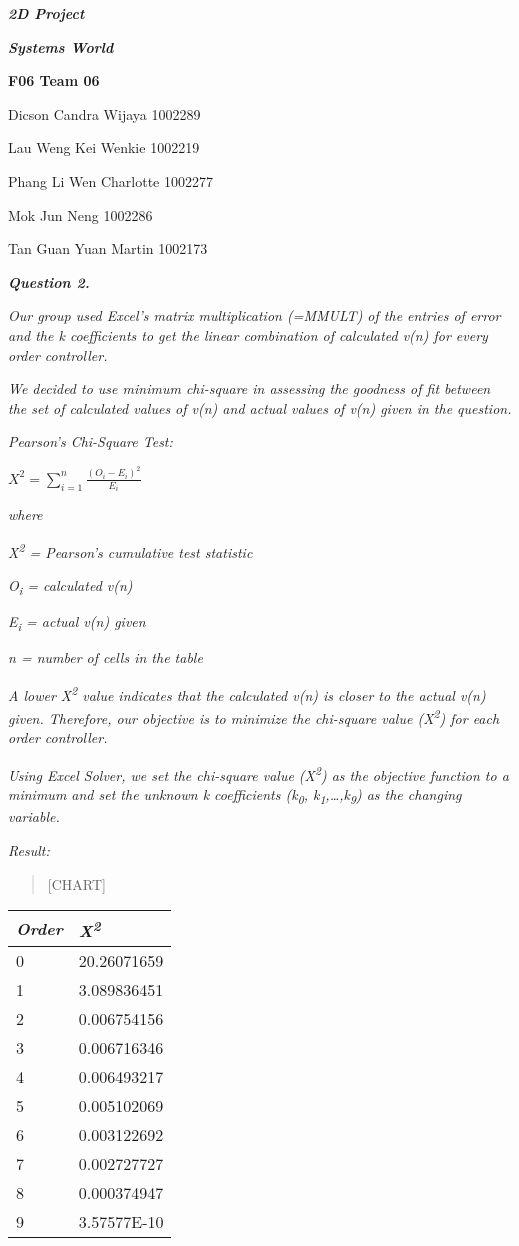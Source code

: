 \documentclass[]{article}
\date{}
\begin{document}
\emph{\textbf{2D Project}}

\emph{\textbf{Systems World}}

\textbf{F06 Team 06}

Dicson Candra Wijaya 1002289

Lau Weng Kei Wenkie 1002219

Phang Li Wen Charlotte 1002277

Mok Jun Neng 1002286

Tan Guan Yuan Martin 1002173

\emph{\textbf{Question 2.}}

\emph{Our group used Excel's matrix multiplication (=MMULT) of the
entries of error and the k coefficients to get the linear combination of
calculated v(n) for every order controller.}

\emph{We decided to use minimum chi-square in assessing the goodness of
fit between the set of calculated values of v(n) and actual values of
v(n) given in the question.}

\emph{Pearson's Chi-Square Test: }

\(X^{2} = \sum_{i = 1}^{n}\frac{\left( O_{i} - E_{i} \right)^{2}}{E_{i}}\)

\emph{where}

\emph{X\textsuperscript{2} = Pearson's cumulative test statistic}

\emph{O\textsubscript{i} = calculated v(n)}

\emph{E\textsubscript{i} = actual v(n) given}

\emph{n = number of cells in the table}

\emph{A lower X\textsuperscript{2} value indicates that the calculated
v(n) is closer to the actual v(n) given. Therefore, our objective is to
minimize the chi-square value (X\textsuperscript{2}) for each order
controller.}

\emph{Using Excel Solver, we set the chi-square value
(X\textsuperscript{2}) as the objective function to a minimum and set
the unknown k coefficients (k\textsubscript{0},
k\textsubscript{1},\ldots{},k\textsubscript{9}) as the changing
variable.}

\emph{Result:}

\begin{quote}
{{[}CHART{]}}
\end{quote}

\begin{longtable}[]{@{}ll@{}}
\toprule
\emph{Order} & \emph{X\textsuperscript{2}}\tabularnewline
\midrule
\endhead
0 & 20.26071659\tabularnewline
1 & 3.089836451\tabularnewline
2 & 0.006754156\tabularnewline
3 & 0.006716346\tabularnewline
4 & 0.006493217\tabularnewline
5 & 0.005102069\tabularnewline
6 & 0.003122692\tabularnewline
7 & 0.002727727\tabularnewline
8 & 0.000374947\tabularnewline
9 & 3.57577E-10\tabularnewline
\bottomrule
\end{longtable}
\end{document}
